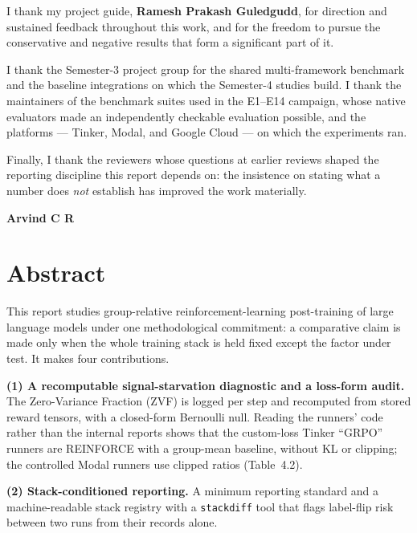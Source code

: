 I thank my project guide, \textbf{Ramesh Prakash Guledgudd}, for direction and
sustained feedback throughout this work, and for the freedom to pursue the
conservative and negative results that form a significant part of it.

I thank the Semester-3 project group for the shared multi-framework benchmark
and the baseline integrations on which the Semester-4 studies build. I thank
the maintainers of the benchmark suites used in the E1--E14 campaign, whose
native evaluators made an independently checkable evaluation possible, and the
platforms --- Tinker, Modal, and Google Cloud --- on which the experiments ran.

Finally, I thank the reviewers whose questions at earlier reviews shaped the
reporting discipline this report depends on: the insistence on stating what a
number does \emph{not} establish has improved the work materially.

\vspace{0.3in}
\noindent\textbf{Arvind C R}

\chapter*{Abstract}
\thispagestyle{plain}

This report studies group-relative reinforcement-learning post-training of
large language models under one methodological commitment: a comparative
claim is made only when the whole training stack is held fixed except the
factor under test. It makes four contributions.

\textbf{(1) A recomputable signal-starvation diagnostic and a loss-form
audit.} The Zero-Variance Fraction (ZVF) is logged per step and recomputed
from stored reward tensors, with a closed-form Bernoulli null. Reading the
runners' code rather than the internal reports shows that the custom-loss
Tinker ``GRPO'' runners are REINFORCE with a group-mean baseline, without KL
or clipping; the controlled Modal runners use clipped ratios (Table~4.2).

\textbf{(2) Stack-conditioned reporting.} A minimum reporting standard and a
machine-readable stack registry with a \texttt{stackdiff} tool that flags
label-flip risk between two runs from their records alone.

